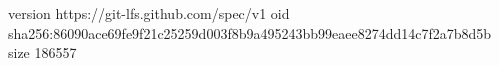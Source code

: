 version https://git-lfs.github.com/spec/v1
oid sha256:86090ace69fe9f21c25259d003f8b9a495243bb99eaee8274dd14c7f2a7b8d5b
size 186557
